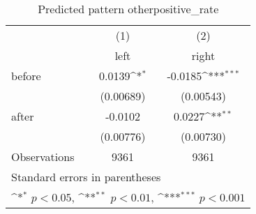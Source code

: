 \begin{table}[htbp]\centering
\def\sym#1{\ifmmode^{#1}\else\(^{#1}\)\fi}
\caption{Predicted pattern otherpositive\_rate}
\begin{tabular}{l*{2}{c}}
\hline\hline
                    &\multicolumn{1}{c}{(1)}&\multicolumn{1}{c}{(2)}\\
                    &\multicolumn{1}{c}{left}&\multicolumn{1}{c}{right}\\
\hline
before              &      0.0139\sym{*}  &     -0.0185\sym{***}\\
                    &   (0.00689)         &   (0.00543)         \\
[1em]
after               &     -0.0102         &      0.0227\sym{**} \\
                    &   (0.00776)         &   (0.00730)         \\
\hline
Observations        &        9361         &        9361         \\
\hline\hline
\multicolumn{3}{l}{\footnotesize Standard errors in parentheses}\\
\multicolumn{3}{l}{\footnotesize \sym{*} \(p<0.05\), \sym{**} \(p<0.01\), \sym{***} \(p<0.001\)}\\
\end{tabular}
\end{table}

